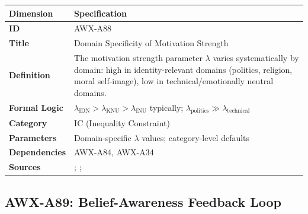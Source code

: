 \begin{table}[htbp]
\small
\begin{tabular}{p{3cm}p{11cm}}
\toprule
\textbf{Dimension} & \textbf{Specification} \\
\midrule
\textbf{ID} & AWX-A88 \\
\textbf{Title} & Domain Specificity of Motivation Strength \\
\textbf{Definition} & The motivation strength parameter $\lambda$ varies systematically by domain: high in identity-relevant domains (politics, religion, moral self-image), low in technical/emotionally neutral domains. \\
\textbf{Formal Logic} & $\lambda_{\text{IDN}} > \lambda_{\text{KNU}} > \lambda_{\text{INU}}$ typically; $\lambda_{\text{politics}} \gg \lambda_{\text{technical}}$ \\
\textbf{Category} & IC (Inequality Constraint) \\
\textbf{Parameters} & Domain-specific $\lambda$ values; category-level defaults \\
\textbf{Dependencies} & AWX-A84, AWX-A34 \\
\textbf{Sources} & \citet{kahan2017motivated}; \citet{taber2006motivated}; \citet{benabou2015economics} \\
\bottomrule
\end{tabular}
\end{table}


\subsection{AWX-A89: Belief-Awareness Feedback Loop}

